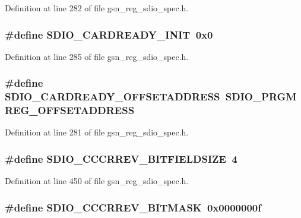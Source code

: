 Definition at line 282 of file gsn\_\-reg\_\-sdio\_\-spec.h.

\hypertarget{a00571_a8ff26acd528904024ee250400b24c391}{
\subsubsection[{SDIO\_\-CARDREADY\_\-INIT}]{\setlength{\rightskip}{0pt plus 5cm}\#define SDIO\_\-CARDREADY\_\-INIT~0x0}}
\label{a00571_a8ff26acd528904024ee250400b24c391}


Definition at line 285 of file gsn\_\-reg\_\-sdio\_\-spec.h.

\hypertarget{a00571_a7085255a34d5a87acc93c55669b23362}{
\subsubsection[{SDIO\_\-CARDREADY\_\-OFFSETADDRESS}]{\setlength{\rightskip}{0pt plus 5cm}\#define SDIO\_\-CARDREADY\_\-OFFSETADDRESS~SDIO\_\-PRGMREG\_\-OFFSETADDRESS}}
\label{a00571_a7085255a34d5a87acc93c55669b23362}


Definition at line 281 of file gsn\_\-reg\_\-sdio\_\-spec.h.

\hypertarget{a00571_a6162597dae32e438ad04f0d46dee0a3a}{
\subsubsection[{SDIO\_\-CCCRREV\_\-BITFIELDSIZE}]{\setlength{\rightskip}{0pt plus 5cm}\#define SDIO\_\-CCCRREV\_\-BITFIELDSIZE~4}}
\label{a00571_a6162597dae32e438ad04f0d46dee0a3a}


Definition at line 450 of file gsn\_\-reg\_\-sdio\_\-spec.h.

\hypertarget{a00571_a4f94afdc11e57d86beed459215ac3acb}{
\subsubsection[{SDIO\_\-CCCRREV\_\-BITMASK}]{\setlength{\rightskip}{0pt plus 5cm}\#define SDIO\_\-CCCRREV\_\-BITMASK~0x0000000f}}
\label{a00571_a4f94afdc11e57d86beed459215ac3acb}


